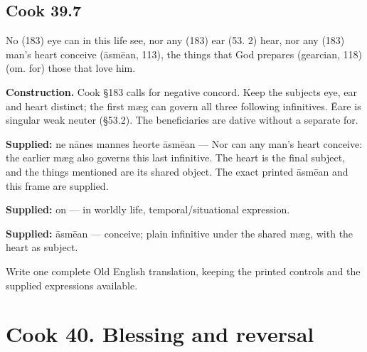\par\begin{minipage}{\linewidth}\raggedright
\subsection*{Cook 39.7}

No (183) eye can in this life see, nor any (183) ear (53. 2) hear, nor any (183) man’s heart conceive (āsmēan, 113), the things that God prepares (gearcian, 118) (om. for) those that love him.

\end{minipage}\par\addvspace{4pt}

\textbf{Construction.} Cook §183 calls for negative concord. Keep the subjects eye, ear and heart distinct; the first mæg can govern all three following infinitives. Ēare is singular weak neuter (§53.2). The beneficiaries are dative without a separate for.

\textbf{Supplied:} ne nānes mannes heorte āsmēan — Nor can any man’s heart conceive: the earlier mæg also governs this last infinitive. The heart is the final subject, and the things mentioned are its shared object. The exact printed āsmēan and this frame are supplied.

\textbf{Supplied:} on — in worldly life, temporal/\allowbreak{}situational expression.

\textbf{Supplied:} āsmēan — conceive; plain infinitive under the shared mæg, with the heart as subject.

Write one complete Old English translation, keeping the printed controls and the supplied expressions available.

\section*{Cook 40. Blessing and reversal}

